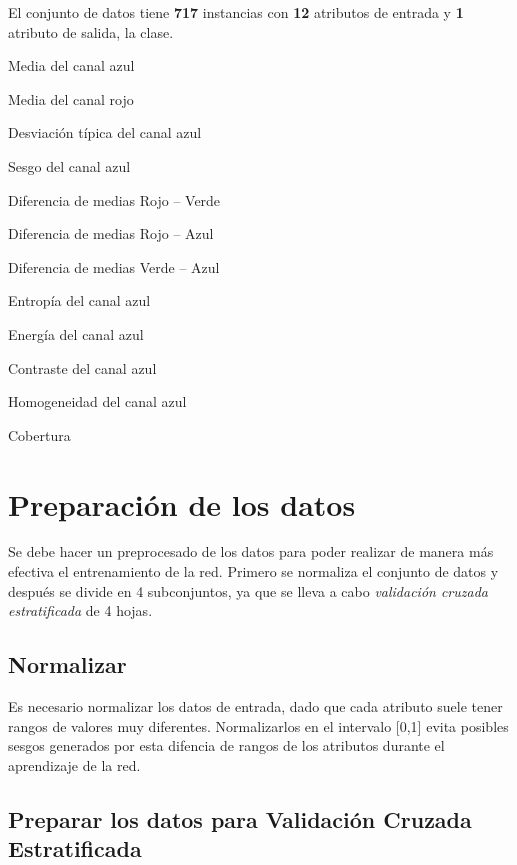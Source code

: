 \documentclass{uc3mpracticas}
\begin{document}
\vspace{2mm}

El conjunto de datos tiene \textbf{717} instancias con \textbf{12} atributos de entrada y \textbf{1} atributo de salida, la clase.

\begin{enumerate}
  \begin{multicols}{2}
  \item Media del canal azul
  \item Media del canal rojo
  \item Desviación típica del canal azul
  \item Sesgo del canal azul
  \item Diferencia de medias Rojo – Verde
  \item Diferencia de medias Rojo – Azul
  \columnbreak
  \item Diferencia de medias Verde – Azul
  \item Entropía del canal azul
  \item Energía del canal azul
  \item Contraste del canal azul
  \item Homogeneidad del canal azul
  \item Cobertura
  \end{multicols}
\end{enumerate}



\section{Preparación de los datos}

Se debe hacer un preprocesado de los datos para poder realizar de manera más efectiva el entrenamiento de la red. Primero se normaliza el conjunto de datos y después se divide en 4 subconjuntos, ya que se lleva a cabo \textit{validación cruzada estratificada} de 4 hojas.

\subsection{Normalizar}

Es necesario normalizar los datos de entrada, dado que cada atributo suele tener rangos de valores muy diferentes. Normalizarlos en el intervalo [0,1] evita posibles sesgos generados por esta difencia de rangos de los atributos durante el aprendizaje de la red.


\subsection{Preparar los datos para Validación Cruzada Estratificada}
\end{document}
